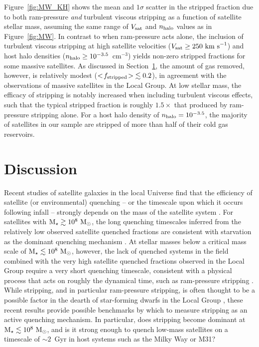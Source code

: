 Figure~\ref{fig:MW_KH} shows the mean and $1\sigma$ scatter in the
stripped fraction due to both ram-pressure \emph{and} turbulent
viscous stripping as a function of satellite stellar mass, assuming
the same range of $V_{\rm sat}$ and $n_{\rm halo}$ values as in
Figure~\ref{fig:MW}.
%
In contrast to when ram-pressure acts alone, the inclusion of
turbulent viscous stripping at high satellite velocities ($V_{\rm sat}
\ge 250~{\rm km~s}^{-1}$) and host halo densities ($n_{\rm halo} \ge
10^{-3.5}$~cm$^{-3}$) yields non-zero stripped fractions for some
massive satellites.
%
As discussed in Section~\ref{sec:disc}, the amount of gas removed,
however, is relatively modest ($< \! f_{\rm stripped} \! > \; \lesssim
0.2$), in agreement with the observations of massive satellites in the
Local Group. 
%
At low stellar mass, the efficacy of stripping is notably increased
when including turbulent viscous effects, such that the typical
stripped fraction is roughly $1.5\times$ that produced by ram-pressure
stripping alone.
%
For a host halo density of $n_{\rm halo} = 10^{-3.5}$, the majority of
satellites in our sample are stripped of more than half of their cold
gas reservoirs. 



\section{Discussion}
\label{sec:disc}


Recent studies of satellite galaxies in the local Universe find that
the efficiency of satellite (or environmental) quenching -- or the
timescale upon which it occurs following infall -- strongly depends on
the mass of the satellite system \citep{delucia12, wetzel13,
  wetzel15b, wheeler14, fham15}. For satellites with ${\rm M}_{\star} \gtrsim
10^{8}~{\rm M}_{\odot}$, the long quenching timescales inferred from the
relatively low observed satellite quenched fractions are consistent
with starvation as the dominant quenching mechanism \citep[][see also
\citealt{davies16}]{fham15}.
%
At stellar masses below a critical mass scale of ${\rm M}_{\star} \lesssim
10^{8}~{\rm M}_{\odot}$, however, the lack of quenched systems in the field
combined with the very high satellite quenched fractions observed in
the Local Group require a very short quenching timescale, consistent
with a physical process that acts on roughly the dynamical time, such
as ram-pressure stripping \citep{wetzel15b, fham15}. 
%
While stripping, and in particular ram-pressure stripping, is often
thought to be a possible factor in the dearth of star-forming dwarfs
in the Local Group \citep{einasto74, lin83, blitz00}, these recent
results provide possible benchmarks by which to measure stripping as
an active quenching mechanism.
%
In particular, does stripping become dominant at ${\rm M}_{\star} \lesssim
10^{8}~{\rm M}_{\odot}$, and is it strong enough to quench low-mass satellites
on a timescale of $\sim2$~Gyr in host systems such as the Milky Way or
M31?





